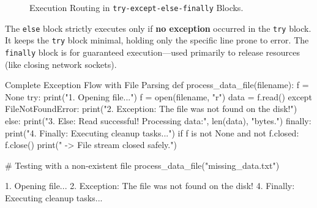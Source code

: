 \begin{figure}[htbp]
\centering
{}
\caption{Execution Routing in \texttt{try-except-else-finally} Blocks.}
\label{fig:exception-flow}
\end{figure}

The \texttt{else} block strictly executes only if \textbf{no exception} occurred in the \texttt{try} block. It keeps the \texttt{try} block minimal, holding only the specific line prone to error. The \texttt{finally} block is for guaranteed execution—used primarily to release resources (like closing network sockets).

\begin{pythoncode}{Complete Exception Flow with File Parsing}
def process_data_file(filename):
    f = None
    try:
        print("1. Opening file...")
        f = open(filename, "r")
        data = f.read()
    except FileNotFoundError:
        print("2. Exception: The file was not found on the disk!")
    else:
        print("3. Else: Read successful! Processing data:", len(data), "bytes.")
    finally:
        print("4. Finally: Executing cleanup tasks...")
        if f is not None and not f.closed:
            f.close()
            print("   -> File stream closed safely.")

# Testing with a non-existent file
process_data_file("missing_data.txt")
\end{pythoncode}
\begin{outputbox}
1. Opening file...
2. Exception: The file was not found on the disk!
4. Finally: Executing cleanup tasks...
\end{outputbox}

